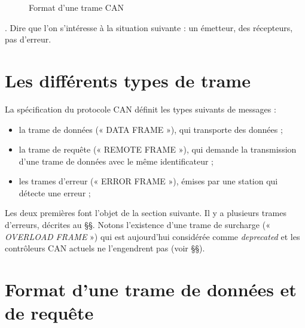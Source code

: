 \begin{figure}[h!]
  \caption{Format d'une trame CAN}
\end{figure}

\cite{pasFini}. Dire que l'on s'intéresse à la situation suivante : un émetteur, des récepteurs, pas d'erreur.

\section{Les différents types de trame}

La spécification du protocole CAN définit les types suivants de messages :
\begin{itemize}
\item  la trame de données (« DATA FRAME »), qui transporte des données ;
\item  la trame de requête (« REMOTE FRAME »), qui demande la transmission d’une trame de données avec le même identificateur ;
\item  les trames d’erreur (« ERROR FRAME »), émises par une station qui détecte une erreur ;
\end{itemize}

Les deux premières font l'objet de la section suivante. Il y a plusieurs trames d'erreurs, décrites au §§. Notons l'existence d'une trame de surcharge (« \emph{OVERLOAD FRAME} ») qui est aujourd'hui considérée comme \emph{deprecated} et les contrôleurs CAN actuels ne l'engendrent pas (voir §§).






\section{Format d'une trame de données et de requête}

